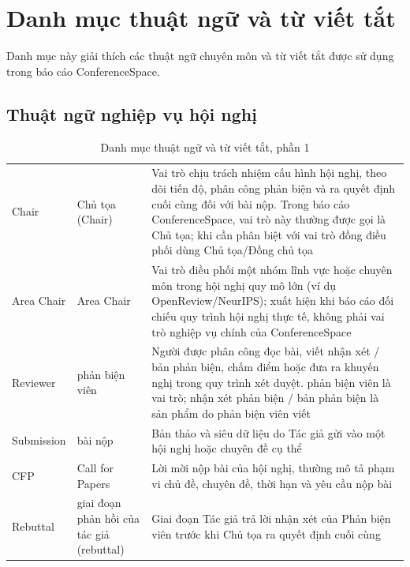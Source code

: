 \chapter*{Danh mục thuật ngữ và từ viết tắt}

Danh mục này giải thích các thuật ngữ chuyên môn và từ viết tắt được sử dụng trong báo cáo ConferenceSpace.

\section*{Thuật ngữ nghiệp vụ hội nghị}

\begingroup
\setlength{\tabcolsep}{2pt}
\renewcommand{\arraystretch}{1.2}
\begin{longtable}{|C{0.16\textwidth}|P{0.22\textwidth}|P{0.55\textwidth}|}
  \caption{Danh mục thuật ngữ và từ viết tắt, phần 1}\\
  \hline
       &        &     \\ \hline
  Chair     &     Chủ tọa (Chair)     &     Vai trò chịu trách nhiệm cấu hình hội nghị, theo dõi tiến độ, phân công phản biện và ra quyết định cuối cùng đối với bài nộp. Trong báo cáo ConferenceSpace, vai trò này thường được gọi là Chủ tọa; khi cần phân biệt với vai trò đồng điều phối dùng Chủ tọa/Đồng chủ tọa \\ \hline
  Area Chair      &      Area Chair      &      Vai trò điều phối một nhóm lĩnh vực hoặc chuyên môn trong hội nghị quy mô lớn (ví dụ OpenReview/NeurIPS); xuất hiện khi báo cáo đối chiếu quy trình hội nghị thực tế, không phải vai trò nghiệp vụ chính của ConferenceSpace \\ \hline
  Reviewer      &      phản biện viên      &      Người được phân công đọc bài, viết nhận xét / bản phản biện, chấm điểm hoặc đưa ra khuyến nghị trong quy trình xét duyệt. phản biện viên là vai trò; nhận xét phản biện / bản phản biện là sản phẩm do phản biện viên viết \\ \hline
  Submission     &     bài nộp     &     Bản thảo và siêu dữ liệu do Tác giả gửi vào một hội nghị hoặc chuyên đề cụ thể \\ \hline
  CFP      &      Call for Papers      &      Lời mời nộp bài của hội nghị, thường mô tả phạm vi chủ đề, chuyên đề, thời hạn và yêu cầu nộp bài \\ \hline
  Rebuttal     &     giai đoạn phản hồi của tác giả (rebuttal)     &     Giai đoạn Tác giả trả lời nhận xét của Phản biện viên trước khi Chủ tọa ra quyết định cuối cùng \\ \hline

\end{longtable}
